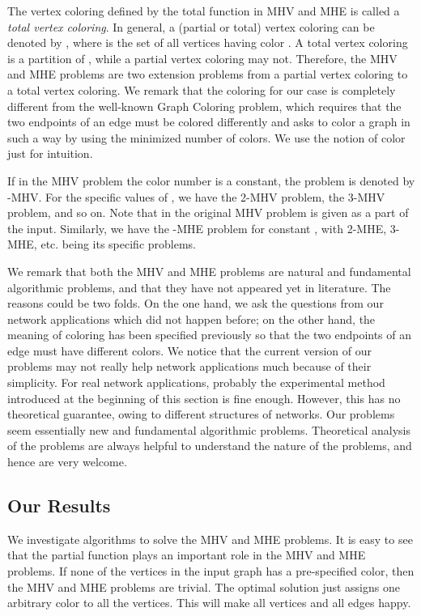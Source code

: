 \documentclass[11pt]{article}
\begin{document}
The vertex coloring defined by the total function 
in MHV and MHE is called a {\em total vertex coloring}.
In general, a (partial or total) vertex coloring can be denoted by
, where  is the set of all vertices having
color . A total vertex coloring is a partition of , while a partial
vertex coloring may not. Therefore, the MHV and MHE problems are two extension
problems from a partial vertex coloring to a total vertex coloring.
We remark that the coloring for our case is completely different from the
well-known Graph Coloring problem, which requires that the two endpoints of
an edge must be colored differently and asks to color a graph in such a way
by using the minimized number of colors. We use the notion of color just
for intuition.

If in the MHV problem the color number  is a constant, the problem is
denoted by -MHV. For the specific values of , we have the 2-MHV problem,
the 3-MHV problem, and so on. Note that in the original MHV problem  is
given as a part of the input. Similarly, we have the -MHE problem for
constant , with 2-MHE, 3-MHE, etc. being its specific problems.

We remark that both the MHV and MHE problems are natural and fundamental
algorithmic problems, and that they have not appeared yet in literature.
The reasons could be two folds. On the one hand, we ask the questions from
our network applications which did not happen before; on the other hand,
the meaning of coloring has been specified previously so that the two
endpoints of an edge must have different colors.
We notice that the current version of our problems may not really help
network applications much because of their simplicity.
For real network applications, probably the experimental method \cite{LLPP12}
introduced at the beginning of this section is fine enough.
However, this has no theoretical guarantee, owing to different structures
of networks. Our problems seem essentially new and fundamental algorithmic
problems. Theoretical analysis of the problems are always helpful to
understand the nature of the problems, and hence are very welcome.




\subsection{Our Results}
We investigate algorithms to solve the MHV and MHE problems.
It is easy to see that the partial function  plays an important role
in the MHV and MHE problems. If none of the vertices in the input graph has
a pre-specified color, then the MHV and MHE problems are trivial. The optimal
solution just assigns one arbitrary color to all the vertices. This will
make all vertices and all edges happy.
\end{document}
